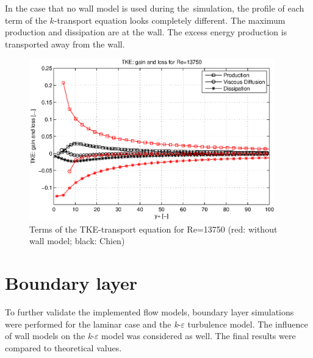 In the case that no wall model is used during the \ke\,simulation, the profile of each term of the $k$-transport equation looks completely different. The maximum production and dissipation are at the wall. The excess energy production is transported away from the wall.

\begin{figure}[!htb]
\centering
\includegraphics[width=0.95\textwidth]{FIGURES/nowallmodel.eps}
\caption{Terms of the TKE-transport equation for Re=13750 (red: without wall model; black: Chien)}
\label{fig:reswithoutwallmodel}
\end{figure} 


\newpage
\section{Boundary layer} %
\label{sec:boundary_layer}



To further validate the implemented flow models, boundary layer simulations were performed for the laminar case and the \textit{k}-$\varepsilon$ turbulence model. The influence of wall models on the \textit{k}-$\varepsilon$ model was considered as well. The final results were compared to theoretical values.

